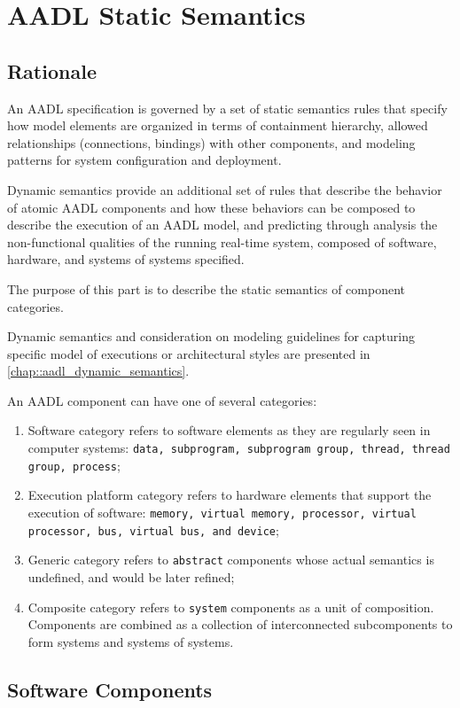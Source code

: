 \chapter{AADL Static Semantics}
\label{chap::aadl_static_semantics}

\section{Rationale}

\N An AADL specification is governed by a set of static semantics rules that specify how model elements are organized in terms of containment hierarchy, allowed relationships (connections, bindings) with other components, and modeling patterns for system configuration and deployment.

\N Dynamic semantics provide an additional set of rules that describe the behavior of atomic AADL components and how these behaviors can be composed to describe the execution of an AADL model, and predicting through analysis the non-functional qualities of the running real-time system, composed of software, hardware, and systems of systems specified.

\N The purpose of this part is to describe the static semantics of component categories.

\N Dynamic semantics and consideration on modeling guidelines for capturing specific model of executions or architectural styles are presented in \ref{chap::aadl_dynamic_semantics}.

\N An AADL component can have one of several categories:
\begin{enumerate}[label=\alph*]
\item Software category refers to software elements as they are regularly seen in computer systems: \texttt{data, subprogram, subprogram group, thread, thread group, process};
\item Execution platform category refers to hardware elements that support the execution of software: \texttt{memory, virtual memory, processor, virtual processor, bus, virtual bus, and device};
\item Generic category refers to \texttt{abstract} components whose actual semantics is undefined, and would be later refined;
\item Composite category refers to \texttt{system} components as a unit of composition. Components are combined as a collection of interconnected subcomponents to form systems and systems of systems.
\end{enumerate}

\section{Software Components}


